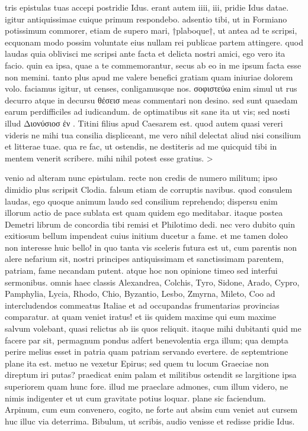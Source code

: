 


 tris epistulas tuas accepi postridie Idus. erant autem iiii, iii, pridie Idus datae. igitur antiquissimae cuique primum respondebo. adsentio tibi, ut in Formiano potissimum commorer, etiam de supero mari, †plaboque†, ut antea ad te scripsi, ecquonam modo possim voluntate eius nullam rei publicae partem attingere. quod laudas quia oblivisci me scripsi ante facta et delicta nostri amici, ego vero ita facio. quin ea ipsa, quae a te commemorantur, secus ab eo in me ipsum facta esse non memini. tanto plus apud me valere benefici gratiam quam iniuriae dolorem volo. faciamus igitur, ut censes, conligamusque nos. σοφιστεύω enim simul ut rus decurro atque in decursu θέσεισ meas commentari non desino. sed sunt quaedam earum perdifficiles ad iudicandum. de optimatibus sit sane ita ut vis; sed nosti illud Διονύσιοσ ἐν . Titini filius apud Caesarem est. quod autem quasi vereri videris ne mihi tua consilia displiceant, me vero nihil delectat aliud nisi consilium et litterae tuae. qua re fac, ut ostendis, ne destiteris ad me quicquid tibi in mentem venerit scribere. mihi nihil potest esse gratius. >

 venio ad alteram nunc epistulam. recte non credis de numero militum; ipso dimidio plus scripsit Clodia. falsum etiam de corruptis navibus. quod consulem laudas, ego quoque animum laudo sed consilium reprehendo; dispersu enim illorum actio de pace sublata est quam quidem ego meditabar. itaque postea Demetri librum de concordia tibi remisi et Philotimo dedi. nec vero dubito quin exitiosum bellum impendeat cuius initium ducetur a fame. et me tamen doleo non interesse huic bello! in quo tanta vis sceleris futura est ut, cum parentis non alere nefarium sit, nostri principes antiquissimam et sanctissimam parentem, patriam, fame necandam putent. atque hoc non opinione timeo sed interfui sermonibus. omnis haec classis Alexandrea, Colchis, Tyro, Sidone, Arado, Cypro, Pamphylia, Lycia, Rhodo, Chio, Byzantio, Lesbo, Zmyrna, Mileto, Coo ad intercludendos commeatus Italiae et ad occupandas frumentarias provincias comparatur. at quam veniet iratus! et iis quidem maxime qui eum maxime salvum volebant, quasi relictus ab iis quos reliquit. itaque mihi dubitanti quid me facere par sit, permagnum pondus adfert benevolentia erga illum; qua dempta perire melius esset in patria quam patriam servando evertere. de septemtrione plane ita est. metuo ne vexetur Epirus; sed quem tu locum Graeciae non direptum iri putas? praedicat enim palam et militibus ostendit se largitione ipsa superiorem quam hunc fore. illud me praeclare admones, cum illum videro, ne nimis indigenter et ut cum gravitate potius loquar. plane sic faciendum. Arpinum, cum eum convenero, cogito, ne forte aut absim cum veniet aut cursem huc illuc via deterrima. Bibulum, ut scribis, audio venisse et redisse pridie Idus.

